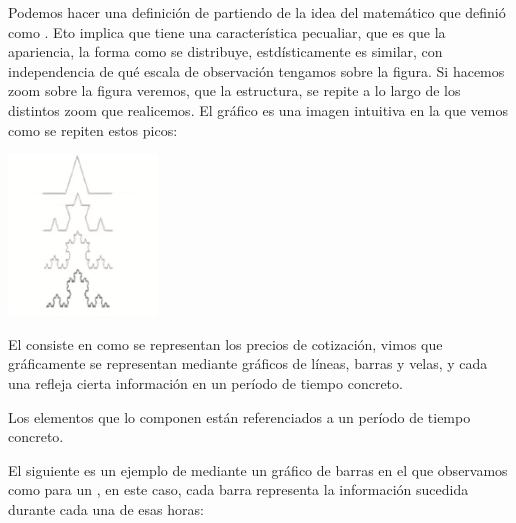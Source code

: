 Podemos hacer una definición de  partiendo de la idea del matemático  que definió  como . Eto implica que tiene una característica pecualiar, que es que la apariencia, la forma como se distribuye, estdísticamente es similar, con independencia de qué escala de observación tengamos sobre la figura. Si hacemos zoom sobre la figura veremos, que la estructura, se repite a lo largo de los distintos zoom que realicemos. El gráfico es una imagen intuitiva en la que vemos como se repiten estos picos:
\begin{center}
    \includegraphics[scale=.80]{images/fractal.png}
\end{center}

El  consiste en como se representan los precios de cotización, vimos que gráficamente se representan mediante gráficos de líneas, barras y velas, y cada una refleja cierta información en un período de tiempo concreto.

Los elementos que lo componen están referenciados a un período de tiempo concreto.

El siguiente es un ejemplo de  mediante un gráfico de barras en el que observamos como para un , en este caso, cada barra representa la información sucedida durante cada una de esas horas:


